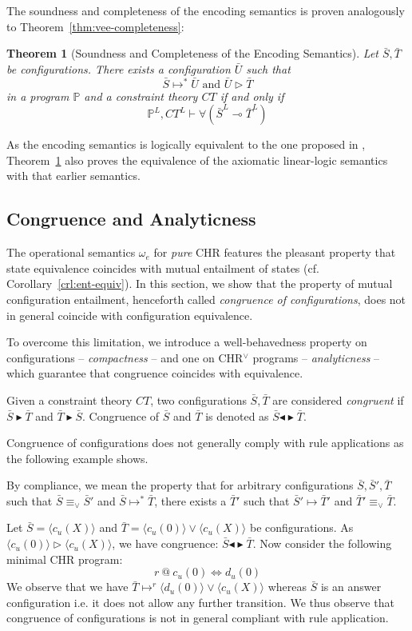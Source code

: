 \documentclass[acmtocl]{acmtrans2m}
\newtheorem{theorem}{Theorem}[section]
\newcommand\state[1]{\langle #1 \rangle}
\newcommand\ent{\rhd}
\newcommand\entv{\blacktriangleright}
\renewcommand\sim{{\blacktriangleleft\blacktriangleright}}
\newcommand\equv{\equiv_\vee}
\newcommand{\bbP}{\ensuremath{\mathbb{P}}}
\newcommand{\bS}{\bar{S}}
\newcommand{\bT}{\bar{T}}
\newcommand{\bU}{\bar{U}}
\newcommand{\oesq}{\ensuremath{\omega_{e}}}
\newcommand{\lp}{\multimap}
\begin{document}
The soundness and completeness of the encoding semantics is proven analogously
to Theorem~\ref{thm:vee-completeness}:

\begin{theorem}[Soundness and Completeness of the Encoding Semantics]
  \label{theorem:chrv_embed_soundness_completeness}
  Let $\bS,\bT$ be configurations. There exists a configuration $\bU$ such that
  \[
    \bS\mapsto^{*}\bU\textrm{ and }\bU\ent \bT
  \]
  in a program $\bbP$ and a constraint theory $CT$ \emph{if and only if}
  \[
    \bbP^L,CT^L \vdash \forall(\bS^L\lp \bT^L)
  \]
\end{theorem}

As the encoding semantics is logically equivalent to the one proposed in
, Theorem~\ref{theorem:chrv_embed_soundness_completeness}
also proves the equivalence of the axiomatic linear-logic semantics with that
earlier semantics.

\subsection{Congruence and Analyticness}
\label{sec:vee-congruence}

The operational semantics $\oesq$ for \emph{pure} CHR features the pleasant
property that state equivalence coincides with mutual entailment of states (cf.
Corollary~\ref{crl:ent-equiv}). In this section, we show that the property of
mutual configuration entailment, henceforth called \emph{congruence of
configurations}, does not in general coincide with configuration equivalence.

To overcome this limitation, we introduce a well-behavedness property on
configurations -- \emph{compactness} -- and one on CHR$^\vee$ programs --
\emph{analyticness} -- which guarantee that congruence coincides with equivalence.

\begin{definition} Given a constraint theory $CT$,
two configurations $\bS,\bT$ are considered \emph{congruent} if $\bS\entv\bT$ and
$\bT\entv\bS$. Congruence of $\bS$ and $\bT$ is denoted as $\bS\sim\bT$.
\end{definition}

Congruence of configurations does not generally comply with rule applications
as the following example shows.

\begin{example} By compliance, we mean the
property that for arbitrary configurations $\bS,\bS',\bT$ such that
$\bS\equv\bS'$ and $\bS\mapsto^{*}\bT$, there exists a $\bT'$ such that
$\bS'\mapsto\bT'$ and $\bT'\equv\bT$.

Let $\bS=\state{c_u(X)}$ and $\bT=\state{c_u(0)}\vee\state{c_u(X)}$ be
configurations. As $\state{c_u(0)}\ent\state{c_u(X)}$, we have congruence:
$\bS\sim\bT$. Now consider the following minimal CHR program: \[
 r\ @\ c_u(0)\Leftrightarrow d_u(0)
\] We observe that we have $\bT\mapsto^r\state{d_u(0)}\vee\state{c_u(X)}$
whereas $\bS$ is an answer configuration i.e. it does not allow any further
transition. We thus observe that congruence of configurations is not in general
compliant with rule application.
\end{example}
\end{document}
